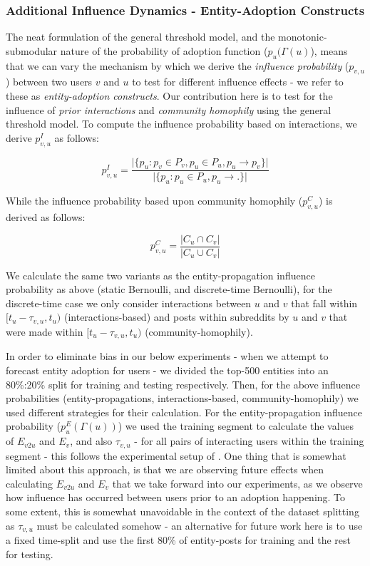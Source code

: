 \documentclass[review]{elsarticle}
\begin{document}
\subsubsection{Additional Influence Dynamics - Entity-Adoption Constructs}
The neat formulation of the general threshold model, and the monotonic-submodular nature of the probability of adoption function ($p_u(\Gamma(u)$), means that we can vary the mechanism by which we derive the \emph{influence probability} ($p_{v,u}$) between two users $v$ and $u$ to test for different influence effects - we refer to these as \emph{entity-adoption constructs}.
Our contribution here is to test for the influence of \emph{prior interactions} and \emph{community homophily} using the general threshold model.
To compute the influence probability based on interactions, we derive $p^I_{v,u}$ as follows:

\begin{equation}
p^{I}_{v,u} = \frac{\vert \{ p_u : p_v \in P_v, p_u \in P_u, p_u \rightarrow p_v \} \vert}{\vert \{ p_u : p_u \in P_u, p_u \rightarrow . \} \vert}
\end{equation}

While the influence probability based upon community homophily ($p_{v,u}^C$) is derived as follows:

\begin{equation}
p^C_{v,u} = \frac{\vert C_u \cap C_v \vert}{\vert C_u \cup C_v \vert}
\end{equation}

We calculate the same two variants as the entity-propagation influence probability as above (static Bernoulli, and discrete-time Bernoulli), for the discrete-time case we only consider interactions between $u$ and $v$ that fall within $[t_u - \tau_{v,u}, t_u)$ (interactions-based) and posts within subreddits by $u$ and $v$ that were made within $[t_u - \tau_{v,u}, t_u)$ (community-homophily).

In order to eliminate bias in our below experiments - when we attempt to forecast entity adoption for users - we divided the top-500 entities into an 80\%:20\% split for training and testing respectively.
Then, for the above influence probabilities (entity-propagations, interactions-based, community-homophily) we used different strategies for their calculation.
For the entity-propagation influence probability ($p^E_u(\Gamma(u))$) we used the training segment to calculate the values of $E_{v2u}$ and $E_v$, and also $\tau_{v,u}$ - for all pairs of interacting users within the training segment - this follows the experimental setup of \cite{goyal2010learning}.
One thing that is somewhat limited about this approach, is that we are observing future effects when calculating $E_{v2u}$ and $E_v$ that we take forward into our experiments, as we observe how influence has occurred between users prior to an adoption happening.
To some extent, this is somewhat unavoidable in the context of the dataset splitting as $\tau_{v,u}$ must be calculated somehow - an alternative for future work here is to use a fixed time-split and use the first 80\% of entity-posts for training and the rest for testing.
\end{document}
